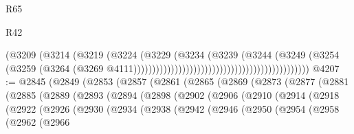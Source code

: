 \begin{lexlean}{R65}
\begin{lexlean}{R42}
\begin{coremodule}
{{{{{{{{{{{{{{{{{{{{{{{{{{{{{{{{{{{{{{{{{{{{{{{{{{{{{{{{{{{{{{{{{{{{{{{{{{{{{{{{{{{{{{{{{{{{{{{{{{{{{{{{{{{{{{{{{{{{{{{{{{{{{{{{{{{{{{{{{{{{{{{{{{{{{{{{{{{{{{{{{{{{{{{{{{{{{{{{{{{{{{{{                                                                        (@3209
                                                                          (@3214
                                                                            (@3219
                                                                              (@3224
                                                                                (@3229
                                                                                  (@3234
                                                                                    (@3239
                                                                                      (@3244
                                                                                        (@3249
                                                                                          (@3254
                                                                                            (@3259
                                                                                              (@3264
                                                                                                (@3269
                                                                                                  @4111)))))))))))))))))))))))))))))))))))))))))))))))
@4207 := @2845
    (@2849
      (@2853
        (@2857
          (@2861
            (@2865
              (@2869
                (@2873
                  (@2877
                    (@2881
                      (@2885
                        (@2889
                          (@2893
                            (@2894
                              (@2898
                                (@2902
                                  (@2906
                                    (@2910
                                      (@2914
                                        (@2918
                                          (@2922
                                            (@2926
                                              (@2930
                                                (@2934
                                                  (@2938
                                                    (@2942
                                                      (@2946
                                                        (@2950
                                                          (@2954
                                                            (@2958
                                                              (@2962
                                                                (@2966
}}}}}}}}}}}}}}}}}}}}}}}}}}}}}}}}}}}}}}}}}}}}}}}}}}}}}}}}}}}}}}}}}}}}}}}}}}}}}}}}}}}}}}}}}}}}}}}}}}}}}}}}}}}}}}}}}}}}}}}}}}}}}}}}}}}}}}}}}}}}}}}}}}}}}}}}}}}}}}}}}}}}}}}}}}}}}}}}}}}}}}}}
\end{coremodule}
\end{lexlean}
\end{lexlean}
